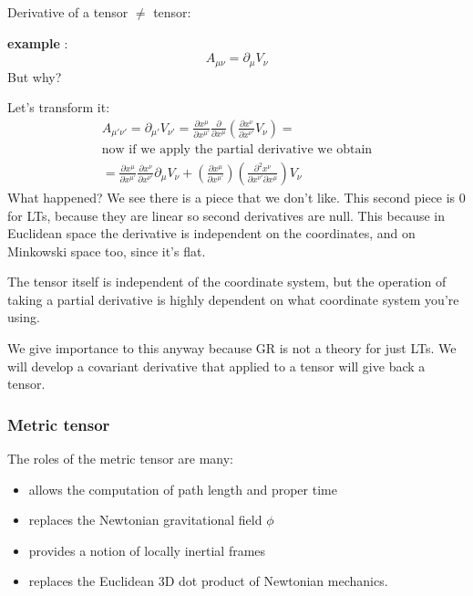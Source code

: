 Derivative of a tensor $\neq$ tensor:\par
\textbf{example} : 
\[
A_{\mu \nu } = \partial_{\mu }V_{\nu }
\]
But why? \par
Let's transform it:
\begin{gather*}
A_{\mu '\nu '} = \partial_{\mu '}V_{\nu '} = \frac{\partial x^{\mu }}{\partial x^{\mu '}} \frac{\partial }{\partial x^{\mu }} \left( \frac{\partial x^{\nu }}{\partial x^{\nu '}}V_{\nu }  \right) = \\
\text{now if we apply the partial derivative we obtain}\\
= \frac{\partial x^{\mu }}{\partial x^{\mu '}} \frac{\partial x^{\nu }}{\partial x^{\nu '}} \partial_{\mu } V_{\nu } + \left( \frac{\partial x^{\mu }}{\partial x^{\mu '}}  \right)\left( \frac{\partial^{2}x^{\nu }}{\partial x^{\nu '}\partial x^{\mu }}  \right)V_{\nu }
\end{gather*}
What happened? We see there is a piece that we don't like. This second piece is 0 for LTs, because they are linear so second derivatives are null. This because in Euclidean space the derivative is independent on the coordinates, and on Minkowski space too, since it's flat. \par
The tensor itself is independent of the coordinate system, but the operation of taking a partial derivative is highly dependent on what coordinate system you're using.\par
We give importance to this anyway because GR is not a theory for just LTs.
We will develop a covariant derivative that applied to a tensor will give back a tensor.

\subsubsection{Metric tensor}
The roles of the metric tensor are many:
\begin{itemize}
	\item allows the computation of path length and proper time
	\item replaces the Newtonian gravitational field $\phi $
	\item provides a notion of locally inertial frames
	\item replaces the Euclidean 3D dot product of Newtonian mechanics.
\end{itemize}

